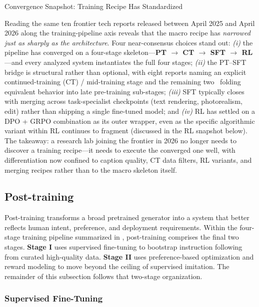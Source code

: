 \documentclass{llmxive}
\begin{document}
\begin{highlightbox}{Convergence Snapshot: Training Recipe Has Standardized}

Reading the same ten frontier tech reports released between April 2025 and April 2026 along the training-pipeline axis reveals that the macro recipe has \emph{narrowed just as sharply as the architecture}. Four near-consensus choices stand out: \emph{(i)} the pipeline has converged on a four-stage skeleton---\textbf{PT $\to$ CT $\to$ SFT $\to$ RL}---and every analyzed system instantiates the full four stages; \emph{(ii)} the PT--SFT bridge is structural rather than optional, with eight reports naming an explicit continued-training (CT) / mid-training stage and the remaining two~\citep{wu2025qwen,cao2025hunyuanimage} folding equivalent behavior into late pre-training sub-stages; \emph{(iii)} SFT typically closes with merging across task-specialist checkpoints (text rendering, photorealism, edit) rather than shipping a single fine-tuned model; and \emph{(iv)} RL has settled on a DPO + GRPO combination as its outer wrapper, even as the specific algorithmic variant within RL continues to fragment (discussed in the RL snapshot below). The takeaway: a research lab joining the frontier in 2026 no longer needs to discover a training recipe---it needs to execute the converged one well, with differentiation now confined to caption quality, CT data filters, RL variants, and merging recipes rather than to the macro skeleton itself.
\end{highlightbox}


\subsection{Post-training}
\label{subsec:post_training}

Post-training transforms a broad pretrained generator into a system that better reflects human intent, preference, and deployment requirements. Within the four-stage training pipeline summarized in , post-training comprises the final two stages. \textbf{Stage I} uses supervised fine-tuning to bootstrap instruction following from curated high-quality data. \textbf{Stage II} uses preference-based optimization and reward modeling to move beyond the ceiling of supervised imitation. The remainder of this subsection follows that two-stage organization.

\subsubsection{Supervised Fine-Tuning}
\label{subsec:sft}
\end{document}
